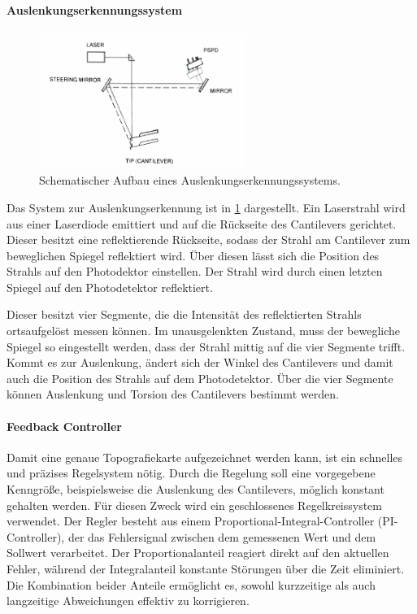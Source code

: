 \paragraph{Auslenkungserkennungssystem}
\begin{figure}
    \centering
    \includegraphics[width=0.6\textwidth]{../assets/messmethoden/afm/02_beam}
    \caption{Schematischer Aufbau eines Auslenkungserkennungssystems. }
    \label{fig:afm-beam}
\end{figure}
Das System zur Auslenkungserkennung ist in \cref{fig:afm-beam} dargestellt.
Ein Laserstrahl wird aus einer Laserdiode emittiert und auf die Rückseite des Cantilevers gerichtet.
Dieser besitzt eine reflektierende Rückseite, sodass der Strahl am Cantilever zum beweglichen Spiegel reflektiert wird.
Über diesen lässt sich die Position des Strahls auf den Photodektor einstellen.
Der Strahl wird durch einen letzten Spiegel auf den Photodetektor reflektiert.

Dieser besitzt vier Segmente, die die Intensität des reflektierten Strahls ortsaufgelöst messen können.
Im unausgelenkten Zustand, muss der bewegliche Spiegel so eingestellt werden, dass der Strahl mittig auf die vier
Segmente trifft.
Kommt es zur Auslenkung, ändert sich der Winkel des Cantilevers und damit auch die Position des Strahls auf dem
Photodetektor.
Über die vier Segmente können Auslenkung und Torsion des Cantilevers bestimmt werden.

\paragraph{Feedback Controller}
Damit eine genaue Topografiekarte aufgezeichnet werden kann, ist ein schnelles und präzises Regelsystem nötig.
Durch die Regelung soll eine vorgegebene Kenngröße, beispielsweise die Auslenkung des Cantilevers, möglich konstant
gehalten werden.
Für diesen Zweck wird ein geschlossenes Regelkreissystem verwendet.
Der Regler besteht aus einem Proportional-Integral-Controller (PI-Controller), der das Fehlersignal zwischen dem
gemessenen Wert und dem Sollwert verarbeitet.
Der Proportionalanteil reagiert direkt auf den aktuellen Fehler, während der Integralanteil konstante Störungen über
die Zeit eliminiert.
Die Kombination beider Anteile ermöglicht es, sowohl kurzzeitige als auch langzeitige Abweichungen effektiv zu
korrigieren.

